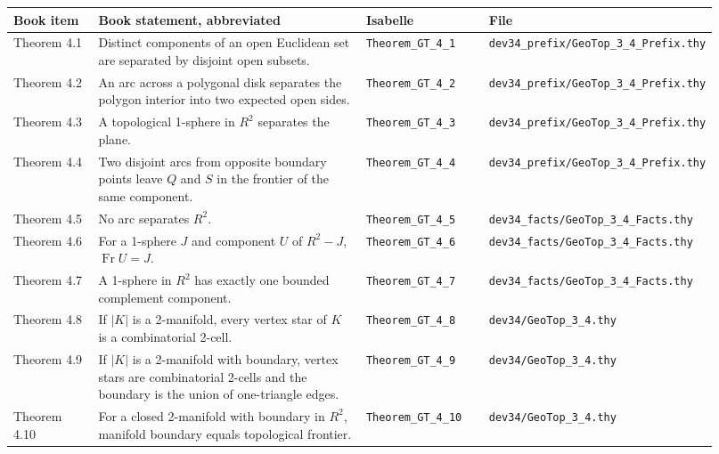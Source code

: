 \documentclass{article}
\begin{document}
\begin{longtable}{>{\raggedright\arraybackslash}p{0.13\linewidth}
                  >{\raggedright\arraybackslash}p{0.45\linewidth}
                  >{\raggedright\arraybackslash}p{0.18\linewidth}
                  >{\raggedright\arraybackslash}p{0.16\linewidth}}
\textbf{Book item} & \textbf{Book statement, abbreviated} & \textbf{Isabelle} & \textbf{File}\\
\hline
Theorem 4.1 & Distinct components of an open Euclidean set are separated by disjoint open subsets. & \texttt{Theorem\_GT\_4\_1} & \texttt{dev34\_prefix/GeoTop\_3\_4\_Prefix.thy}\\
Theorem 4.2 & An arc across a polygonal disk separates the polygon interior into two expected open sides. & \texttt{Theorem\_GT\_4\_2} & \texttt{dev34\_prefix/GeoTop\_3\_4\_Prefix.thy}\\
Theorem 4.3 & A topological 1-sphere in \(R^2\) separates the plane. & \texttt{Theorem\_GT\_4\_3} & \texttt{dev34\_prefix/GeoTop\_3\_4\_Prefix.thy}\\
Theorem 4.4 & Two disjoint arcs from opposite boundary points leave \(Q\) and \(S\) in the frontier of the same component. & \texttt{Theorem\_GT\_4\_4} & \texttt{dev34\_prefix/GeoTop\_3\_4\_Prefix.thy}\\
Theorem 4.5 & No arc separates \(R^2\). & \texttt{Theorem\_GT\_4\_5} & \texttt{dev34\_facts/GeoTop\_3\_4\_Facts.thy}\\
Theorem 4.6 & For a 1-sphere \(J\) and component \(U\) of \(R^2-J\), \(\operatorname{Fr} U=J\). & \texttt{Theorem\_GT\_4\_6} & \texttt{dev34\_facts/GeoTop\_3\_4\_Facts.thy}\\
Theorem 4.7 & A 1-sphere in \(R^2\) has exactly one bounded complement component. & \texttt{Theorem\_GT\_4\_7} & \texttt{dev34\_facts/GeoTop\_3\_4\_Facts.thy}\\
Theorem 4.8 & If \(|K|\) is a 2-manifold, every vertex star of \(K\) is a combinatorial 2-cell. & \texttt{Theorem\_GT\_4\_8} & \texttt{dev34/GeoTop\_3\_4.thy}\\
Theorem 4.9 & If \(|K|\) is a 2-manifold with boundary, vertex stars are combinatorial 2-cells and the boundary is the union of one-triangle edges. & \texttt{Theorem\_GT\_4\_9} & \texttt{dev34/GeoTop\_3\_4.thy}\\
Theorem 4.10 & For a closed 2-manifold with boundary in \(R^2\), manifold boundary equals topological frontier. & \texttt{Theorem\_GT\_4\_10} & \texttt{dev34/GeoTop\_3\_4.thy}\\
\end{longtable}
\end{document}

